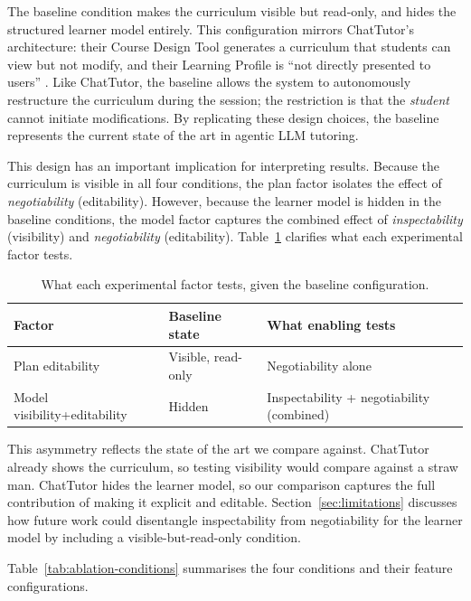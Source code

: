 \documentclass[logo,bsc,singlespacing,parskip,online]{infthesis}
\begin{document}
The baseline condition makes the curriculum visible but read-only, and hides the structured learner model entirely. This configuration mirrors ChatTutor's architecture: their Course Design Tool generates a curriculum that students can view but not modify, and their Learning Profile is ``not directly presented to users'' \citep{chen2024chattutor}. Like ChatTutor, the baseline allows the system to autonomously restructure the curriculum during the session; the restriction is that the \textit{student} cannot initiate modifications. By replicating these design choices, the baseline represents the current state of the art in agentic LLM tutoring.

This design has an important implication for interpreting results. Because the curriculum is visible in all four conditions, the plan factor isolates the effect of \textit{negotiability} (editability). However, because the learner model is hidden in the baseline conditions, the model factor captures the combined effect of \textit{inspectability} (visibility) and \textit{negotiability} (editability). Table~\ref{tab:ablation-factors} clarifies what each experimental factor tests.

\begin{table}[ht]
\centering
\caption{What each experimental factor tests, given the baseline configuration.}
\label{tab:ablation-factors}
\begin{tabular}{lll}
\toprule
\textbf{Factor} & \textbf{Baseline state} & \textbf{What enabling tests} \\
\midrule
Plan editability & Visible, read-only & Negotiability alone \\
Model visibility+editability & Hidden & Inspectability + negotiability (combined) \\
\bottomrule
\end{tabular}
\end{table}

This asymmetry reflects the state of the art we compare against. ChatTutor already shows the curriculum, so testing visibility would compare against a straw man. ChatTutor hides the learner model, so our comparison captures the full contribution of making it explicit and editable. Section~\ref{sec:limitations} discusses how future work could disentangle inspectability from negotiability for the learner model by including a visible-but-read-only condition.

Table~\ref{tab:ablation-conditions} summarises the four conditions and their feature configurations.
\end{document}
